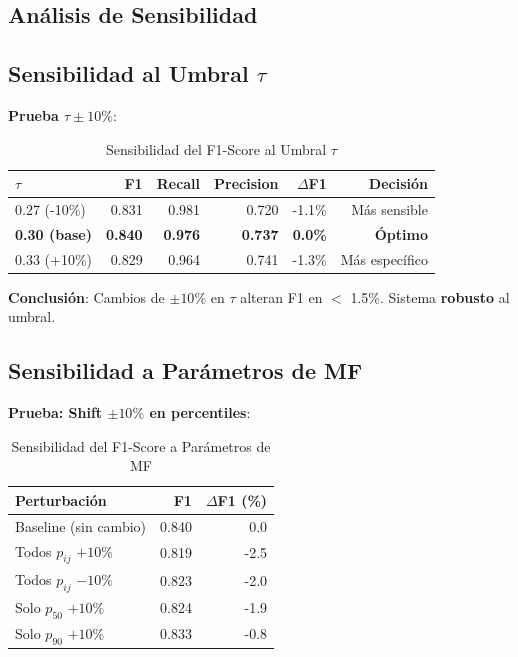\documentclass[12pt,letterpaper,twoside]{report}
\begin{document}
\begin{calculobox}
\section{Análisis de Sensibilidad}

\subsection{Sensibilidad al Umbral $\tau$}

\begin{calculobox}
\textbf{Prueba $\tau \pm 10\%$}:

\begin{table}[H]
\centering
\caption{Sensibilidad del F1-Score al Umbral $\tau$}
\label{tab:tau_sensitivity}
\begin{tabular}{@{}lrrrrr@{}}
\toprule
\textbf{$\tau$} & \textbf{F1} & \textbf{Recall} & \textbf{Precision} & \textbf{$\Delta$F1} & \textbf{Decisión} \\
\midrule
0.27 (-10\%) & 0.831 & 0.981 & 0.720 & -1.1\% & Más sensible \\
\textbf{0.30 (base)} & \textbf{0.840} & \textbf{0.976} & \textbf{0.737} & \textbf{0.0\%} & \textbf{Óptimo} \\
0.33 (+10\%) & 0.829 & 0.964 & 0.741 & -1.3\% & Más específico \\
\bottomrule
\end{tabular}
\end{table}

\textbf{Conclusión}: Cambios de $\pm 10\%$ en $\tau$ alteran F1 en $<$ 1.5\%. Sistema \textbf{robusto} al umbral.
\end{calculobox}

\subsection{Sensibilidad a Parámetros de MF}

\begin{calculobox}
\textbf{Prueba: Shift $\pm 10\%$ en percentiles}:

\begin{table}[H]
\centering
\caption{Sensibilidad del F1-Score a Parámetros de MF}
\label{tab:mf_sensitivity}
\begin{tabular}{@{}lrr@{}}
\toprule
\textbf{Perturbación} & \textbf{F1} & \textbf{$\Delta$F1 (\%)} \\
\midrule
Baseline (sin cambio)   & 0.840 & 0.0 \\
Todos $p_{ij}$ $+10\%$  & 0.819 & -2.5 \\
Todos $p_{ij}$ $-10\%$  & 0.823 & -2.0 \\
Solo $p_{50}$ $+10\%$   & 0.824 & -1.9 \\
Solo $p_{90}$ $+10\%$   & 0.833 & -0.8 \\
\bottomrule
\end{tabular}
\end{table}


\end{calculobox}
\end{calculobox}
\end{document}
